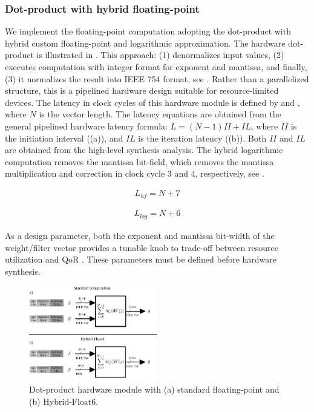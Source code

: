 \subsubsection{\textbf{Dot-product with hybrid floating-point}}
\label{sec:dot_product}
We implement the floating-point computation adopting the dot-product with hybrid custom floating-point and logarithmic approximation\cite{nevarez2021accelerating}. The hardware dot-product is illustrated in . This approach: (1) denormalizes input values, (2) executes computation with integer format for exponent and mantissa, and finally, (3) it normalizes the result into IEEE 754 format, see . Rather than a parallelized structure, this is a pipelined hardware design suitable for resource-limited devices. The latency in clock cycles of this hardware module is defined by  and , where $N$ is the vector length. The latency equations are obtained from the general pipelined hardware latency formula: $L=\left(N-1\right)II+IL$, where $II$ is the initiation interval ((a)), and $IL$ is the iteration latency ((b)). Both $II$ and $IL$ are obtained from the high-level synthesis analysis. The hybrid logarithmic computation removes the mantissa bit-field, which removes the mantissa multiplication and correction in clock cycle 3 and 4, respectively, see .

\begin{eqnarray} \label{eq:dot_custom_float_latency}
L_{hf}=N+7
\end{eqnarray}

\begin{eqnarray} \label{eq:dot_log_latency}
L_{log}=N+6
\end{eqnarray}

As a design parameter, both the exponent and mantissa bit-width of the weight/filter vector provides a tunable knob to trade-off between resource utilization and QoR \cite{park2009dynamic}. These parameters must be defined before hardware synthesis.

\begin{figure}[t!]
	\centering
	\includegraphics[width=0.5\textwidth]{../figures/dot-product_unit.pdf}
	\caption{Dot-product hardware module with (a) standard floating-point and (b) Hybrid-Float6.}
	\label{fig:dot_product}
\end{figure}

